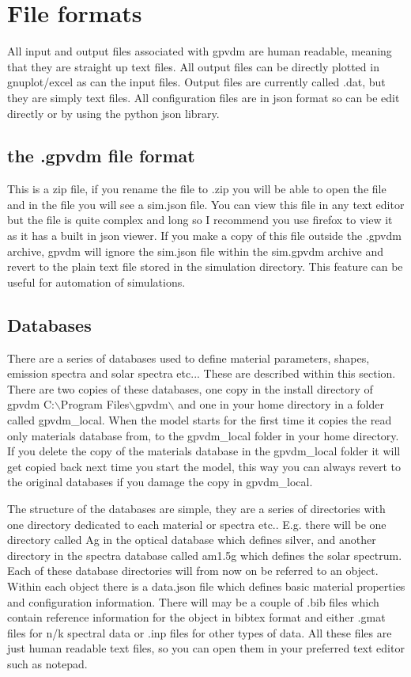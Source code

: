 \section{File formats}
All input and output files associated with gpvdm are human readable, meaning that they are straight up text files.  All output files can be directly plotted in gnuplot/excel as can the input files.  Output files are currently called .dat, but they are simply text files. All configuration files are in json format so can be edit directly or by using the python json library.

\subsection{the .gpvdm file format}
This is a zip file, if you rename the file to .zip you will be able to open the file and in the file you will see a sim.json file.  You can view this file in any text editor but the file is quite complex and long so I recommend you use firefox to view it as it has a built in json viewer.  If you make a copy of this file outside the .gpvdm archive, gpvdm will ignore the sim.json file within the sim.gpvdm archive and revert to the plain text file stored in the simulation directory.  This feature can be useful for automation of simulations.

\subsection{Databases}
There are a series of databases used to define material parameters, shapes, emission spectra and solar spectra etc...  These are described within this section.  There are two copies of these databases, one copy in the install directory of gpvdm  C:$\backslash$Program Files$\backslash$gpvdm$\backslash$ and one in your home directory in a folder called gpvdm\_local.   When the model starts for the first time it copies the read only materials database from, to the gpvdm\_local folder in your home directory.  If you delete the copy of the materials database in the gpvdm\_local folder it will get copied back next time you start the model, this way you can always revert to the original databases if you damage the copy in gpvdm\_local.

The structure of the databases are simple, they are a series of directories with one directory dedicated to each material or spectra etc.. E.g. there will be one directory called Ag in the optical database which defines silver, and another directory in the spectra database called am1.5g which defines the solar spectrum.  Each of these database directories will from now on be referred to an object.  Within each object there is a data.json file which defines basic material properties and configuration information.  There will may be a couple of .bib files which contain reference information for the object in bibtex format and either .gmat files for n/k spectral data or .inp files for other types of data.  All these files are just human readable text files, so you can open them in your preferred text editor such as notepad.

